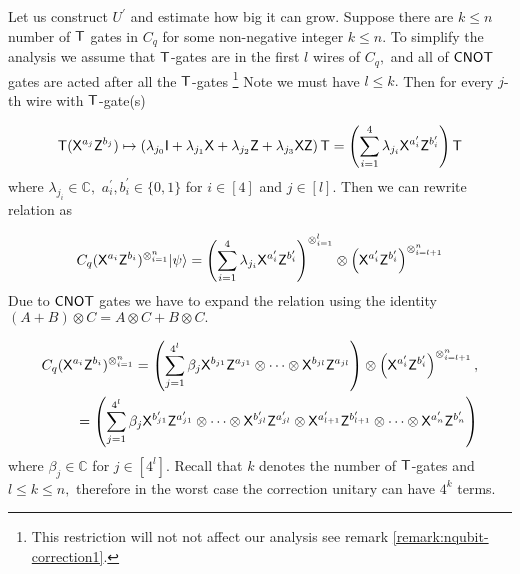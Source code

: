 Let us construct $U^\prime$ and estimate how big it can grow. Suppose there are $k\leq n$ number of ${\sf T}$ gates in $C_q$ for some non-negative integer $k\leq n.$ To simplify the analysis we assume that ${\sf T}$-gates are in the first $l$ wires of $C_q,$ and all of ${\sf CNOT}$ gates are acted after all the ${\sf T}$-gates \footnote{This restriction will not not affect our analysis see remark \cref{remark:nqubit-correction1}.} Note we must have $l\leq k.$ Then for every $j$-th wire with ${\sf T}$-gate(s)

\begin{equation}
\begin{aligned}
\label{nqubit:eq7}
{\sf T}({\sf X}^{a_{j}}{\sf Z}^{b_{j}})\mapsto \left(\lambda_{j_0} {\sf I} + \lambda_{j_1} {\sf X} + \lambda_{j_2} {\sf Z} + \lambda_{j_3} {\sf X} {\sf Z} \right){\sf T}=\left(\sum_{i=1}^4 \lambda_{j_i} {\sf X}^{a_{i}^\prime}{\sf Z}^{b_{i}^\prime}\right){\sf T}\\
 \end{aligned}
\end{equation}
where $\lambda_{j_i}\in\mathbb{C}, $  $a_{i}^\prime, b_{i}^\prime \in\{0,1\}$ for $i\in[4]$ and $j\in[l].$ Then we can rewrite relation  as


\begin{equation}
\label{nqubit:eq8}
\begin{aligned}
 C_q ({\sf X}^{a_{i}}{\sf Z}^{b_{i}})^{\otimes_{i=1}^{n}}{\lvert}\psi\rangle= \left(\sum_{i=1}^4 \lambda_{j_i} {\sf X}^{a_{i}^\prime}{\sf Z}^{b_{i}^\prime}\right)^{\otimes_{i=1}^{l}} \otimes \left({\sf X}^{a_{i}^\prime}{\sf Z}^{b_{i}^\prime}\right)^{\otimes_{i=l+1}^{n}}\\
\end{aligned}
\end{equation}
Due to ${\sf CNOT}$ gates we have to expand the relation   using the identity $(A+B)\otimes C=A\otimes C + B\otimes C.$


\begin{equation}
\label{nqubit:eq9}
\begin{aligned}
C_q ({\sf X}^{a_{i}}{\sf Z}^{b_{i}})^{\otimes_{i=1}^{n}}=\left(\sum_{j=1}^{4^l} \beta_j {\sf X}^{b_{j1}}{\sf Z}^{a_{j1}} \otimes \cdots \otimes{\sf X}^{b_{jl}}{\sf Z}^{a_{jl}}\right) \otimes \left({\sf X}^{a_{i}^\prime}{\sf Z}^{b_{i}^\prime}\right)^{\otimes_{i=l+1}^{n}}, \\
 =\left(\sum_{j=1}^{4^{l}} \beta_j {\sf X}^{b_{j1}^\prime}{\sf Z}^{a_{j1}^\prime} \otimes \cdots \otimes{\sf X}^{b_{jl}^\prime}{\sf Z}^{a_{jl}^\prime} \otimes {\sf X}^{a_{l+1}^\prime}{\sf Z}^{b_{l+1}^\prime}  \otimes \cdots   \otimes{\sf X}^{a_{n}^\prime}{\sf Z}^{b_{n}^\prime}\right)
 \end{aligned}
\end{equation}
where $\beta_j\in \mathbb{C}$ for $j\in[4^l].$  Recall that $k$ denotes the number of ${\sf T}$-gates and $l\leq k\leq n,$ therefore in the worst case the correction unitary can have $4^k$ terms.



